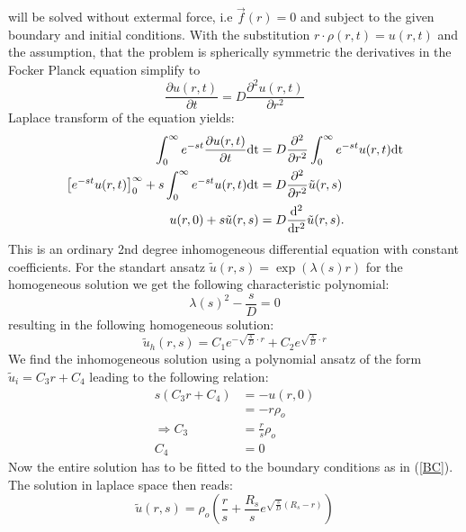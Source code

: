 will be solved without extermal force, i.e $\vec f(r) = 0$ and subject to the given boundary and initial conditions.
With the substitution $r \cdot \rho(r,t) = u(r,t)$ and the assumption, that the problem is spherically symmetric the derivatives in the Focker Planck equation simplify to
\begin{equation}
    \frac{\partial u(r,t)}{\partial t} = D \frac{\partial ^2 u(r,t)}{\partial r^2}
    \label{Simplified FPE}
\end{equation}
Laplace transform of the equation yields:
\begin{align}
    \int_0^\infty e^{-st}\frac{\partial u(r,t)}{\partial t} \rm{d} t &= D \frac{\partial ^2 }{\partial r^2} \int_0^\infty e^{-st} u(r,t) \rm{d} t \\
    \left[e^{-st} u(r,t) \right]_0^\infty + s \int_0^\infty e^{-st} u(r,t) \rm{d} t &= D \frac{\partial^2}{\partial r^2} \tilde{u}(r,s)\\
    u(r,0) + s \tilde{u}(r,s) &= D \frac{\rm{d}^2}{\rm{d} r^2} \tilde{u}(r,s).
\end{align}
This is an ordinary 2nd degree inhomogeneous differential equation with constant coefficients.
For the standart ansatz $\tilde{u}(r,s) = \exp(\lambda(s) r)$ for the homogeneous solution we get the following characteristic polynomial:
\begin{equation}
    \lambda(s) ^2 - \frac{s}{D} = 0
    \label{}
\end{equation}
resulting in the following homogeneous solution:
\begin{equation}
    \tilde{u}_h(r,s) = C_1 e^{ - \sqrt{\frac{s}{D}} \cdot r } + C_2 e^{ \sqrt{\frac{s}{D}} \cdot r }
    \label{u_h}
\end{equation}
We find the inhomogeneous solution using a polynomial ansatz of the form $\tilde{u}_i = C_3 r + C_4$ leading to the following relation:
\begin{align}
    s(C_3 r + C_4)  &= -u(r,0)\\
                    &= - r \rho_o \\
    \Rightarrow C_3 &= \frac{r}{s}\rho_o \\
                C_4 &= 0
\end{align}
Now the entire solution has to be fitted to the boundary conditions as in (\ref{BC}). The solution in laplace space then reads:
\begin{equation}
\tilde{u}(r,s) = \rho_o \left( \frac{r}{s} + \frac{R_s}{s} e^{ \sqrt{\frac{s}{D}}(R_s - r) } \right) 
\end{equation}
